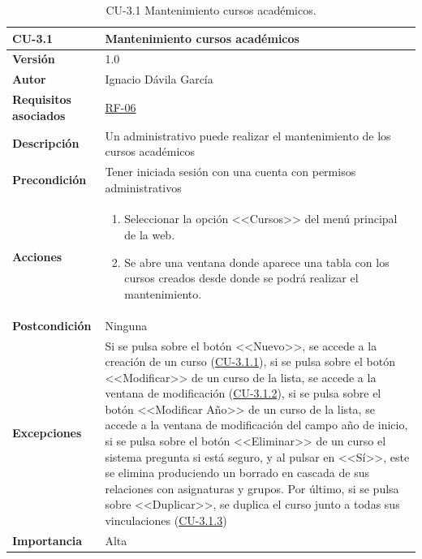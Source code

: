 \begin{table}[p]
\label{table:CU-3.1}
	\centering
	\begin{tabularx}{\linewidth}{ p{} p{} }
		\toprule
		\textbf{CU-3.1}    & \textbf{Mantenimiento cursos académicos}\\
		\toprule
		\textbf{Versión}              & 1.0    \\
		\textbf{Autor}                & Ignacio Dávila García \\
		\textbf{Requisitos asociados} & \hyperref[itm:RF6]{RF-06} \\
		\textbf{Descripción}          & Un administrativo puede realizar el mantenimiento de los cursos académicos \\
		\textbf{Precondición}         & Tener iniciada sesión con una cuenta con permisos administrativos \\
		\textbf{Acciones}             &
		\begin{enumerate}
			\def\labelenumi{\arabic{enumi}.}
			\tightlist
			\item Seleccionar la opción <<Cursos>> del menú principal de la web.
			\item Se abre una ventana donde aparece una tabla con los cursos creados desde donde se podrá realizar el mantenimiento.
		\end{enumerate}\\
		\textbf{Postcondición}        & Ninguna \\
		\textbf{Excepciones}          & Si se pulsa sobre el botón <<Nuevo>>, se accede a la creación de un curso (\hyperref[table:CU-3.1.1]{CU-3.1.1}), si se pulsa sobre el botón <<Modificar>> de un curso de la lista, se accede a la ventana de modificación (\hyperref[table:CU-3.1.2]{CU-3.1.2}), si se pulsa sobre el botón <<Modificar Año>> de un curso de la lista, se accede a la ventana de modificación del campo año de inicio, si se pulsa sobre el botón <<Eliminar>> de un curso el sistema pregunta si está seguro, y al pulsar en <<Sí>>, este se elimina produciendo un borrado en cascada de sus relaciones con asignaturas y grupos. Por último, si se pulsa sobre <<Duplicar>>, se duplica el curso junto a todas sus vinculaciones  (\hyperref[table:CU-3.1.3]{CU-3.1.3})\\
		\textbf{Importancia}          & Alta \\
		\bottomrule
	\end{tabularx}
	\caption{CU-3.1 Mantenimiento cursos académicos.}
\end{table}
\FloatBarrier


